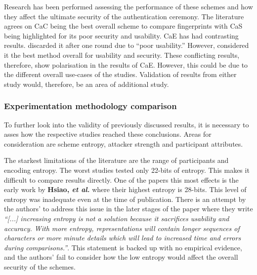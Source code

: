 Research has been performed assessing the performance of these schemes and how they affect the ultimate security of the authentication ceremony. The literature agrees on CaC being the best overall scheme to compare fingerprints \cite{tan2017can}\cite{uzun2007usability} with CaS being highlighted for its poor security and usability. CaE has  had contrasting results. \cite{uzun2007usability} discarded it after one round due to ``poor usability.'' However, \cite{tan2017can} considered it the best method overall for usability and security. These conflicting results, therefore, show polarisation in the results of CaE. However, this could be due to the different overall use-cases of the studies. Validation of results from either study would, therefore, be an area of additional study.


\subsubsection*{Experimentation methodology comparison}
To further look into the validity of previously discussed results, it is necessary to asses how the respective studies reached these conclusions. Areas for consideration are scheme entropy, attacker strength and participant attributes.

The starkest limitations of the literature are the range of participants and encoding entropy. The worst studies tested only 22-bits of entropy. This makes it difficult to compare results directly. One of the papers this most effects is the early work by \textbf{Hsiao, \textit{et al.}}\cite{hsiao2009study}  where their highest entropy is 28-bits. This level of entropy was inadequate even at the time of publication. There is an attempt by the authors' to address this issue in the later stages of the paper where they write \textit{``[...] increasing entropy is not a solution because it sacrifices usability and accuracy. With more entropy, representations will contain longer sequences of characters or more minute details which will lead to increased time and errors during comparisons.''}. This statement is backed up with no empirical evidence, and the authors' fail to consider how the low entropy would affect the overall security of the schemes.

